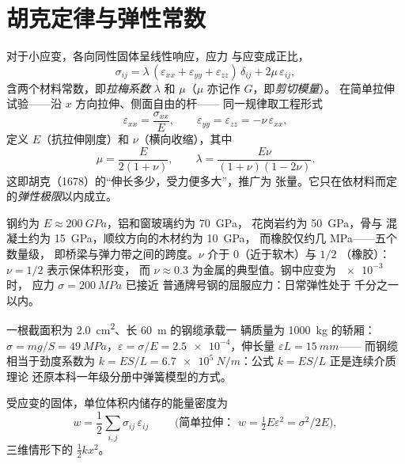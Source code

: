 \section{胡克定律与弹性常数}

\begin{theorem}[线性各向同性弹性]\label{thm:b3:continuum-elasticity:hooke}
对于小应变，各向同性固体呈线性响应，应力
与应变成正比，
\[
\sigma_{ij} = \lambda\,(\varepsilon_{xx} + \varepsilon_{yy} +
\varepsilon_{zz})\,\delta_{ij} + 2\mu\,\varepsilon_{ij} ,
\]
含两个材料常数，即\emph{拉梅系数} $\lambda$ 和
$\mu$（$\mu$ 亦记作 $G$，即\emph{剪切模量}）。
在简单拉伸试验——沿 $x$ 方向拉伸、侧面自由的杆——
同一规律取工程形式
\[
\varepsilon_{xx} = \frac{\sigma_{xx}}{E} , \qquad
\varepsilon_{yy} = \varepsilon_{zz} = -\nu\,\varepsilon_{xx} ,
\]
定义\emph{} $E$（抗拉伸刚度）和
\emph{} $\nu$（横向收缩），其中
\[
\mu = \frac{E}{2(1 + \nu)} , \qquad
\lambda = \frac{E\nu}{(1 + \nu)(1 - 2\nu)} .
\]
这即胡克（1678）的“伸长多少，受力便多大”，推广为
张量。它只在依材料而定的\emph{弹性极限}以内成立。
\end{theorem}
\admitted

\begin{remark}[数量级]\label{rem:b3:continuum-elasticity:orders}
钢约为 $E \approx \qty{200}{GPa}$，铝和窗玻璃约为 \qty{70}{GPa}，
花岗岩约为 \qty{50}{GPa}，骨与
混凝土约为 \qty{15}{GPa}，顺纹方向的木材约为 \qty{10}{GPa}，
而橡胶仅约几 MPa——五个数量级，
即桥梁与弹力带之间的跨度。$\nu$ 介于 $0$（近于软木）与 $1/2$
（橡胶）：$\nu = 1/2$ 表示保体积形变，
而 $\nu \approx 0.3$ 为金属的典型值。钢中应变为 $\num{e-3}$ 时，
应力 $\sigma = \qty{200}{MPa}$ 已接近
普通牌号钢的屈服应力：日常弹性处于
千分之一以内。
\end{remark}

\begin{example}[电梯缆绳]\label{ex:b3:continuum-elasticity:cable}
一根截面积为 \qty{2.0}{cm^2}、长 \qty{60}{m} 的钢缆承载一
辆质量为 \qty{1000}{kg} 的轿厢：$\sigma = mg/S = \qty{49}{MPa}$，$\varepsilon =
\sigma/E = \num{2.5e-4}$，伸长量 $\varepsilon L = \qty{15}{mm}$——
而钢缆相当于劲度系数为 $k = ES/L =
\qty{6.7e5}{N/m}$：公式 $k = ES/L$ 正是连续介质理论
还原本科一年级分册中弹簧模型的方式。
\end{example}

\begin{proposition}[弹性能]\label{prop:b3:continuum-elasticity:energy}
受应变的固体，单位体积内储存的能量密度为
\[
w = \frac12\sum_{i,j}\sigma_{ij}\,\varepsilon_{ij}
\qquad\text{ (简单拉伸： } w = \tfrac12 E\varepsilon^2 =
\sigma^2/2E\text{)} ,
\]
三维情形下的 $\tfrac12 kx^2$。
\end{proposition}


